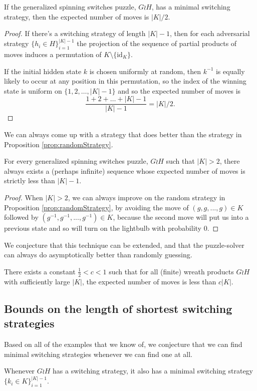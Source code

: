 \begin{proposition}
If the generalized spinning switches puzzle, $G \wr H$, has a minimal switching
strategy, then the expected number of moves is $|K|/2$.
\end{proposition}
\begin{proof}
  If there's a switching strategy of length $|K| - 1$,
  then for each adversarial strategy $\{h_i \in H\}_{i=1}^{|K| - 1}$
  the projection of the sequence of partial products of moves induces
  a permutation of $K \setminus \{\mathrm{id}_K\}$.

  If the initial hidden state $k$ is chosen uniformly at random, then
  $k^{-1}$ is equally likely to occur at any position in this permutation,
  so the index of the winning state is uniform on
  ${\{1, 2, \dots, |K| - 1\}}$ and so the expected number of moves is \[
    \frac{1 + 2 + \dots + |K| - 1}{|K| - 1} = |K|/2.
  \]
\end{proof}

We can always come up with a strategy that does better than the strategy in
Proposition \ref{prop:randomStrategy}.

\begin{proposition}
  For every generalized spinning switches puzzle, $G \wr H$ such that
  $|K| > 2$, there always exists a (perhaps infinite) sequence
  whose expected number of moves is strictly less than $|K| - 1$.
\end{proposition}
\begin{proof}
  When $|K| > 2$, we can always improve on the random strategy in
  Proposition \ref{prop:randomStrategy}, by avoiding the move of
  $(g,g, ..., g) \in K$ followed by $(g^{-1},g^{-1}, ..., g^{-1}) \in K$,
  because the second move will put us into a previous state and so will
  turn on the lightbulb with probability $0$.
\end{proof}

We conjecture that this technique can be extended, and that the puzzle-solver
can always do asymptotically better than randomly guessing.

\begin{conjecture}
  There exists a constant $\frac{1}{2} < c < 1$ such that for all
  (finite) wreath products $G \wr H$ with sufficiently large $|K|$,
  the expected number of moves is less than $c|K|$.
\end{conjecture}

\subsection{Bounds on the length of shortest switching strategies}
Based on all of the examples that we know of, we conjecture that we can find
minimal switching strategies whenever we can find one at all.
\begin{conjecture}
  Whenever $G \wr H$ has a switching strategy, it also has a minimal switching
  strategy $\{k_i \in K\}_{i=1}^{|K| - 1}$.
\end{conjecture}

